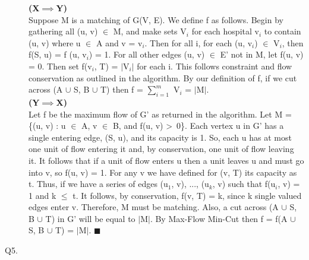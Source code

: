 \documentclass[10pt]{csc_assignment}
\begin{document}
\begin{description}
\textbf{(X$\implies$Y)}\\
Suppose M is a matching of G(V, E). We define f as follows. Begin by gathering all (u, v) $\in$ M, and make sets V$_{i}$ for each hospital v$_{i}$ to contain (u, v) where u $\in$ A and v = v$_{i}$. Then for all i, for each (u, v$_{i}$) $\in$ V$_{i}$, then f(S, u) = f (u, v$_{i}$) = 1. For all other edges (u, v) $\in$ E' not in M, let f(u, v) = 0. Then set f(v$_{i}$, T) = $\mid$V$_{i}$$\mid$ for each i. This follows constraint and flow conservation as outlined in the algorithm. By our definition of f, if we cut across (A $\cup$ {S}, B $\cup$ {T}) then f = $\sum_{i=1}^{m}$ V$_{i}$ = $\mid$M$\mid$.\\
\textbf{(Y$\implies$X)}\\
Let f be the maximum flow of G' as returned in the algorithm. Let M = \{(u, v) : u $\in$ A, v $\in$ B, and f(u, v) \textgreater ~0\}. Each vertex u in G' has a single entering edge, (S, u), and its capacity is 1. So, each u has at most one unit of flow entering it and, by conservation, one unit of flow leaving it. It follows that if a unit of flow enters u then a unit leaves u and must go into v, so f(u, v) = 1. For any v we have defined for (v, T) its capacity as t. Thus, if we have a series of edges {(u$_{1}$, v), ..., (u$_{k}$, v)} such that f(u$_{i}$, v) = 1 and k $\leqslant$ t. It follows, by conservation, f(v, T) = k, since k single valued edges enter v. Therefore, M must be matching. Also, a cut across (A $\cup$ {S}, B $\cup$ {T}) in G' will be equal to $\mid$M$\mid$. By Max-Flow Min-Cut then f = f(A $\cup$ {S}, B $\cup$ {T}) = $\mid$M$\mid$. $\blacksquare$\\
    

\newpage
\item[Q5.]


\end{description}
\end{document}

